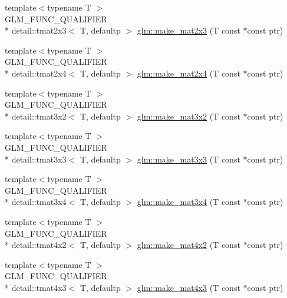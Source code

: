 \begin{DoxyCompactItemize}
{\footnotesize template$<$typename T $>$ }\\G\-L\-M\-\_\-\-F\-U\-N\-C\-\_\-\-Q\-U\-A\-L\-I\-F\-I\-E\-R \\*
detail\-::tmat2x3$<$ T, defaultp $>$ \hyperlink{group__gtc__type__ptr_gadef48cd950566f23a4b1e47127ee478c}{glm\-::make\-\_\-mat2x3} (T const $\ast$const ptr)
\item 
{\footnotesize template$<$typename T $>$ }\\G\-L\-M\-\_\-\-F\-U\-N\-C\-\_\-\-Q\-U\-A\-L\-I\-F\-I\-E\-R \\*
detail\-::tmat2x4$<$ T, defaultp $>$ \hyperlink{group__gtc__type__ptr_ga174a43e8913682834de9cd918e36df25}{glm\-::make\-\_\-mat2x4} (T const $\ast$const ptr)
\item 
{\footnotesize template$<$typename T $>$ }\\G\-L\-M\-\_\-\-F\-U\-N\-C\-\_\-\-Q\-U\-A\-L\-I\-F\-I\-E\-R \\*
detail\-::tmat3x2$<$ T, defaultp $>$ \hyperlink{group__gtc__type__ptr_gaa40868af4de8c5ed5470fdcc9985dbfc}{glm\-::make\-\_\-mat3x2} (T const $\ast$const ptr)
\item 
{\footnotesize template$<$typename T $>$ }\\G\-L\-M\-\_\-\-F\-U\-N\-C\-\_\-\-Q\-U\-A\-L\-I\-F\-I\-E\-R \\*
detail\-::tmat3x3$<$ T, defaultp $>$ \hyperlink{group__gtc__type__ptr_gaf8ba0a0a523423ae1149a1c2d90eb337}{glm\-::make\-\_\-mat3x3} (T const $\ast$const ptr)
\item 
{\footnotesize template$<$typename T $>$ }\\G\-L\-M\-\_\-\-F\-U\-N\-C\-\_\-\-Q\-U\-A\-L\-I\-F\-I\-E\-R \\*
detail\-::tmat3x4$<$ T, defaultp $>$ \hyperlink{group__gtc__type__ptr_gaa0c07ac459a5e16374aa12e3b35ee043}{glm\-::make\-\_\-mat3x4} (T const $\ast$const ptr)
\item 
{\footnotesize template$<$typename T $>$ }\\G\-L\-M\-\_\-\-F\-U\-N\-C\-\_\-\-Q\-U\-A\-L\-I\-F\-I\-E\-R \\*
detail\-::tmat4x2$<$ T, defaultp $>$ \hyperlink{group__gtc__type__ptr_gae4ad99adfe4fb195a192712a71de901d}{glm\-::make\-\_\-mat4x2} (T const $\ast$const ptr)
\item 
{\footnotesize template$<$typename T $>$ }\\G\-L\-M\-\_\-\-F\-U\-N\-C\-\_\-\-Q\-U\-A\-L\-I\-F\-I\-E\-R \\*
detail\-::tmat4x3$<$ T, defaultp $>$ \hyperlink{group__gtc__type__ptr_ga37ec66362c22d86ad2ee11930b638c4a}{glm\-::make\-\_\-mat4x3} (T const $\ast$const ptr)

\end{DoxyCompactItemize}
